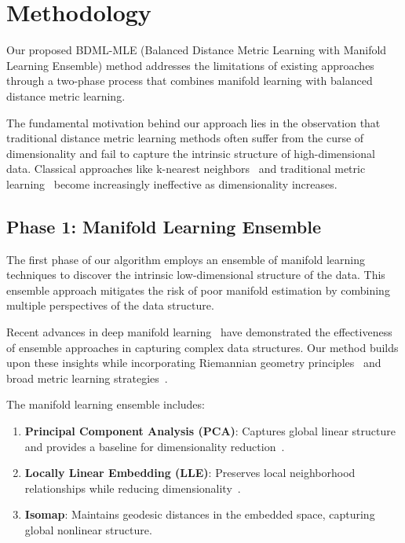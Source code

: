\documentclass[review]{elsarticle}
\begin{document}
\section{Methodology}

Our proposed BDML-MLE (Balanced Distance Metric Learning with Manifold Learning Ensemble) method addresses the limitations of existing approaches through a two-phase process that combines manifold learning with balanced distance metric learning.

The fundamental motivation behind our approach lies in the observation that traditional distance metric learning methods often suffer from the curse of dimensionality and fail to capture the intrinsic structure of high-dimensional data. Classical approaches like k-nearest neighbors~\cite{cover1967nearest} and traditional metric learning~\cite{xing2002distance} become increasingly ineffective as dimensionality increases.

\subsection{Phase 1: Manifold Learning Ensemble}

The first phase of our algorithm employs an ensemble of manifold learning techniques to discover the intrinsic low-dimensional structure of the data. This ensemble approach mitigates the risk of poor manifold estimation by combining multiple perspectives of the data structure.

Recent advances in deep manifold learning~\cite{xu2025deep} have demonstrated the effectiveness of ensemble approaches in capturing complex data structures. Our method builds upon these insights while incorporating Riemannian geometry principles~\cite{gruffaz2025riemannian} and broad metric learning strategies~\cite{hu2025broad}.

The manifold learning ensemble includes:

\begin{enumerate}
\item \textbf{Principal Component Analysis (PCA)}: Captures global linear structure and provides a baseline for dimensionality reduction~\cite{weinberger2009distance}.
\item \textbf{Locally Linear Embedding (LLE)}: Preserves local neighborhood relationships while reducing dimensionality~\cite{goldberger2005neighbourhood}.
\item \textbf{Isomap}: Maintains geodesic distances in the embedded space, capturing global nonlinear structure.
\end{enumerate}
\end{document}
